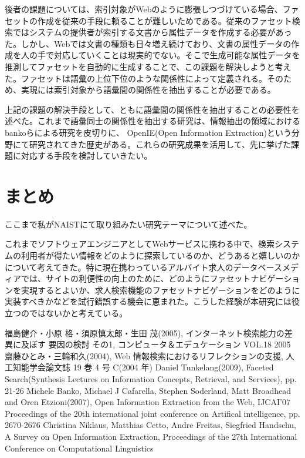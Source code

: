 \documentclass[a4j,12pt, twocolumn]{jarticle}
\begin{document}
 後者の課題については、索引対象がWebのように膨張しつづけている場合、ファセットの作成を従来の手段に頼ることが難しいためである。従来のファセット検索ではシステムの提供者が索引する文書から属性データを作成する必要があった。しかし、Webでは文書の種類も日々増え続けており、文書の属性データの作成を人の手で対応していくことは現実的でない。そこで生成可能な属性データを推測してファセットを自動的に生成することで、この課題を解決しようと考えた。ファセットは語彙の上位下位のような関係性によって定義される。そのため、実現には索引対象から語彙間の関係性を抽出することが必要である。

上記の課題の解決手段として、ともに語彙間の関係性を抽出することの必要性を述べた。これまで語彙同士の関係性を抽出する研究は、情報抽出の領域におけるbankoらによる研究\cite{banko}を皮切りに、 OpenIE(Open Information Extraction)という分野にて研究されてきた歴史がある\cite{niklaus}。これらの研究成果を活用して、先に挙げた課題に対応する手段を検討していきたい。

\section{まとめ}
ここまで私がNAISTにて取り組みたい研究テーマについて述べた。

 これまでソフトウェアエンジニアとしてWebサービスに携わる中で、検索システムの利用者が得たい情報をどのように探索しているのか、どうあると嬉しいのかについて考えてきた。特に現在携わっているアルバイト求人のデータベースメディアでは、サイトの利便性の向上のために、どのようにファセットナビゲーションを実現するとよいか、求人検索機能のファセットナビゲーションをどのように実装すべきかなどを試行錯誤する機会に恵まれた。こうした経験が本研究には役立つのではないかと考えている。

\begin{thebibliography}{9}
   福島健介・小原 格・須原慎太郎・生田 茂(2005), インターネット検索能力の差異に及ぼす 要因の検討 その1, コンピュータ＆エデュケーション VOL.18 2005
   齋藤ひとみ・三輪和久(2004),  Web 情報検索におけるリフレクションの支援, 人工知能学会論文誌 19 巻 4 号 C(2004 年)
  Daniel Tunkelang(2009), Faceted Search(Synthesis Lectures on Information Concepts, Retrieval, and Services), pp. 21-26
  Michele Banko, Michael J Cafarella, Stephen Soderland, Matt Broadhead and Oren Etzioni(2007), Open Information Extraction from the Web, IJCAI'07 Proceedings of the 20th international joint conference on Artifical intelligence, pp. 2670-2676 
  Christina Niklaus, Matthias Cetto, Andre Freitas, Siegfried Handschu, A Survey on Open Information Extraction, Proceedings of the 27th International Conference on Computational Linguistics
\end{thebibliography}
\end{document}
